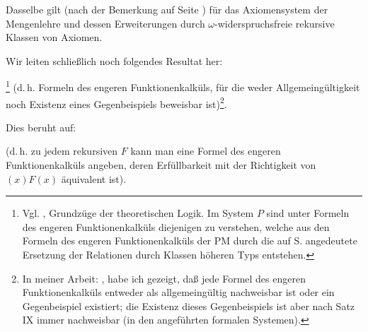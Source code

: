 \documentclass[draft]{scrartcl}
\begin{document}
\label{satzvii}

Dasselbe gilt (nach der Bemerkung auf Seite \pageref{fussnote46})
für das Axiomensystem der Mengenlehre und dessen Erweiterungen durch $\omega$-widerspruchsfreie rekursive
Klassen von Axiomen.

Wir leiten schließlich noch folgendes Resultat her:

\footnote{Vgl. ,
Grundzüge der theoretischen Logik. Im System $P$ sind unter Formeln des engeren
Funktionenkalküls diejenigen zu verstehen, welche aus den Formeln des engeren
Funktionenkalküls der PM durch die auf S. \pageref{ersetzungdurchklassen} angedeutete Ersetzung der
Relationen durch Klassen höheren Typs entstehen.} (d.\,h. Formeln des engeren
Funktionenkalküls, für die weder Allgemeingültigkeit noch Existenz eines
Gegenbeispiels beweisbar ist)\footnote{In meiner Arbeit: ,
habe ich gezeigt, daß jede Formel des engeren Funktionenkalküls entweder als
allgemeingültig nachweisbar ist oder ein Gegenbeispiel existiert; die Existenz
dieses Gegenbeispiels ist aber nach Satz IX  immer nachweisbar (in den
angeführten formalen Systemen).}.

Dies beruht auf:

 (d.\,h. zu jedem rekursiven $F$ kann man eine Formel des engeren
Funktionenkalküls angeben, deren Erfüllbarkeit mit der Richtigkeit von
$\left(x\right)F\left(x\right)$ äquivalent ist).
\end{document}
